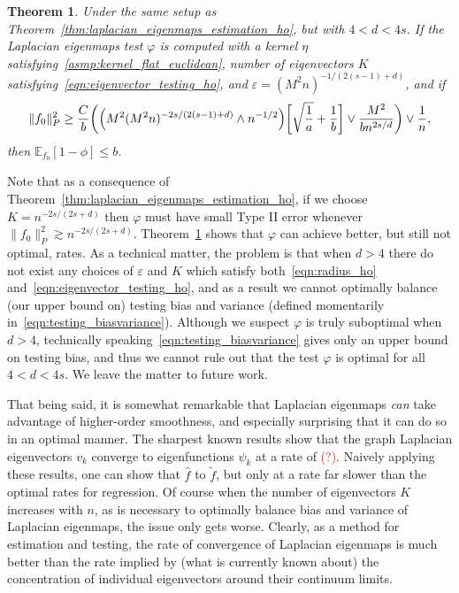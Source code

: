 \documentclass{article}
\newcommand{\1}{\mathbf{1}}
\newcommand{\Ebb}{\mathbb{E}}
\newcommand{\wt}[1]{\widetilde{#1}}
\newcommand{\wh}[1]{\widehat{#1}}
\theoremstyle{alden}
\theoremstyle{aldenthm}
\newtheorem{theorem}{Theorem}
\theoremstyle{definition}
\theoremstyle{remark}
\begin{document}
\begin{theorem}
	\label{thm:laplacian_eigenmaps_testing_ho_suboptimal}
	Under the same setup as Theorem~\ref{thm:laplacian_eigenmaps_estimation_ho}, but with $4 < d < 4s$. If the Laplacian eigenmaps test $\varphi$ is computed with a kernel $\eta$ satisfying~\ref{asmp:kernel_flat_euclidean}, number of eigenvectors $K$ satisfying~\eqref{eqn:eigenvector_testing_ho}, and $\varepsilon = (M^2n)^{-1/(2(s - 1) + d)}$, and if 
	\begin{equation}
	\label{eqn:laplacian_eigenmaps_testing_criticalradius_ho_suboptimal}
	\|f_0\|_P^2 \geq \frac{C}{b}\biggl(\Bigl(M^2(M^2n)^{-2s/(2(s - 1) + d) } \wedge n^{-1/2}\Bigr)\biggl[\sqrt{\frac{1}{a}} + \frac{1}{b}\biggr] \vee \frac{M^2}{b n^{2s/d}} \biggr) \vee \frac{1}{n},
	\end{equation}
	then $\Ebb_{f_0}[1 - \phi] \leq b$.
\end{theorem}
Note that as a consequence of Theorem~\ref{thm:laplacian_eigenmaps_estimation_ho}, if we choose $K = n^{-2s/(2s + d)}$ then $\varphi$ must have small Type II error whenever $\|f_0\|_P^2 \gtrsim n^{-2s/(2s + d)}$. Theorem~\ref{thm:laplacian_eigenmaps_testing_ho_suboptimal} shows that $\varphi$ can achieve better, but still not optimal, rates. As a technical matter, the problem is that when $d > 4$ there do not exist any choices of $\varepsilon$ and $K$ which satisfy both~\eqref{eqn:radius_ho} and~\eqref{eqn:eigenvector_testing_ho}, and as a result we cannot optimally balance (our upper bound on) testing bias and variance (defined momentarily in~\eqref{eqn:testing_biasvariance}). Although we suspect $\varphi$ is truly suboptimal when $d > 4$, technically speaking~\eqref{eqn:testing_biasvariance} gives only an upper bound on testing bias, and thus we cannot rule out that the test $\varphi$ is optimal for all $4 < d < 4s$. We leave the matter to future work.

That being said, it is somewhat remarkable that Laplacian eigenmaps \emph{can} take advantage of higher-order smoothness, and especially surprising that it can do so in an optimal manner. The sharpest known results show that the graph Laplacian eigenvectors $v_k$ converge to eigenfunctions $\psi_k$ at a rate of \textcolor{red}{(?)}. Naively applying these results, one can show that $\wh{f}$ to $\wt{f}$, but only at a rate far slower than the optimal rates for regression. Of course when the number of eigenvectors $K$ increases with $n$, as is necessary to optimally balance bias and variance of Laplacian eigenmaps, the issue only gets worse. Clearly, as a method for estimation and testing, the rate of convergence of Laplacian eigenmaps is much better than the rate implied by (what is currently known about) the concentration of individual eigenvectors around their continuum limits.
\end{document}
